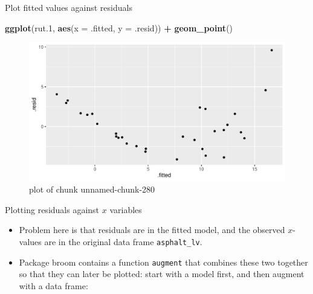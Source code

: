 \documentclass[ignorenonframetext,]{beamer}
\newenvironment{Shaded}{\begin{snugshade}}{\end{snugshade}}
\newcommand{\DataTypeTok}[1]{\textcolor[rgb]{0.13,0.29,0.53}{#1}}
\newcommand{\FloatTok}[1]{\textcolor[rgb]{0.00,0.00,0.81}{#1}}
\newcommand{\KeywordTok}[1]{\textcolor[rgb]{0.13,0.29,0.53}{\textbf{#1}}}
\newcommand{\NormalTok}[1]{#1}
\newcommand{\OperatorTok}[1]{\textcolor[rgb]{0.81,0.36,0.00}{\textbf{#1}}}
\newcommand{\StringTok}[1]{\textcolor[rgb]{0.31,0.60,0.02}{#1}}
\providecommand{\tightlist}{%
  \setlength{\itemsep}{0pt}\setlength{\parskip}{0pt}}
\begin{document}
\begin{frame}[fragile]{Plot fitted values against residuals}
\protect\hypertarget{plot-fitted-values-against-residuals}{}

\begin{Shaded}
\begin{Highlighting}[]
\KeywordTok{ggplot}\NormalTok{(rut}\FloatTok{.1}\NormalTok{, }\KeywordTok{aes}\NormalTok{(}\DataTypeTok{x =}\NormalTok{ .fitted, }\DataTypeTok{y =}\NormalTok{ .resid)) }\OperatorTok{+}\StringTok{ }\KeywordTok{geom_point}\NormalTok{()}
\end{Highlighting}
\end{Shaded}

\begin{figure}
\centering
\includegraphics{figure/unnamed-chunk-280-1.pdf}
\caption{plot of chunk unnamed-chunk-280}
\end{figure}

\end{frame}

\begin{frame}[fragile]{Plotting residuals against \(x\) variables}
\protect\hypertarget{plotting-residuals-against-x-variables}{}

\begin{itemize}
\tightlist
\item
  Problem here is that residuals are in the fitted model, and the
  observed \(x\)-values are in the original data frame
  \texttt{asphalt\_lv}.
\item
  Package broom contains a function \texttt{augment} that combines these
  two together so that they can later be plotted: start with a model
  first, and then augment with a data frame:
\end{itemize}

\begin{Shaded}
\end{Shaded}

\end{frame}
\end{document}
